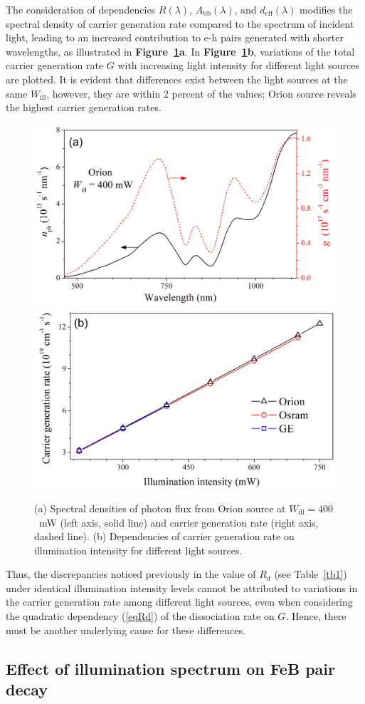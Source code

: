 \documentclass{WileyMSP-template}
\begin{document}
The consideration of dependencies $R(\lambda)$, $A_\mathrm{bb}(\lambda)$, and $d_\mathrm{eff}(\lambda)$ modifies
the spectral density of carrier generation rate compared to the spectrum of incident light,
leading to an increased contribution to e-h pairs generated with shorter wavelengths,
as illustrated in \textbf{Figure~\ref{fig5}a}.
In \textbf{Figure~\ref{fig5}b}, variations of the total carrier generation rate $G$ with increasing light intensity for different light sources are plotted.
It is evident that differences exist between the light sources at the same $W_\mathrm{ill}$,
however, they are within 2 percent of the values;
Orion source reveals the highest carrier generation rates.

\begin{figure}
\centering
  \includegraphics[width=0.4\linewidth]{Fig5a.png}
  \includegraphics[width=0.4\linewidth]{Fig5b.png}
  \caption{
  (a) Spectral densities of photon flux from Orion source at $W_\mathrm{ill}=400$~mW (left axis, solid line) and carrier generation rate (right axis, dashed line).
  (b) Dependencies of carrier generation rate on illumination intensity for different light sources.
  }
  \label{fig5}
\end{figure}

Thus, the discrepancies noticed previously in the value of $R_d$ (see Table~\ref{tb1}) under identical illumination intensity levels
cannot be attributed to variations in the carrier generation rate among different light sources,
even when considering the quadratic dependency (\ref{eqRd}) of the dissociation rate on $G$.
Hence, there must be another underlying cause for these differences.


\subsection{Effect of illumination spectrum on FeB pair decay}\label{SecLast}
\end{document}

